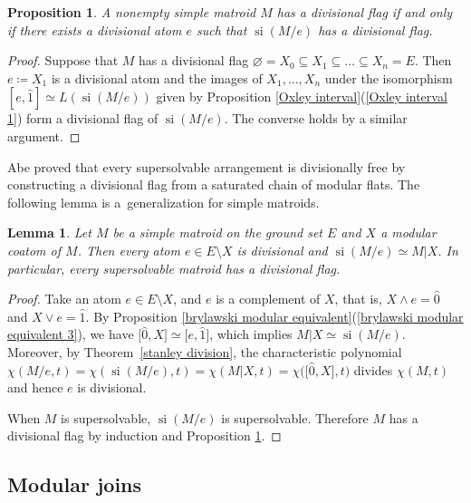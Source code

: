 \documentclass[11pt]{article}
\newtheorem{Lemma}[Theorem]{Lemma}
\newtheorem{Proposition}[Theorem]{Proposition}
 { \theoremstyle{definition}
\newtheorem{Definition}[Theorem]{Definition}
\newtheorem{Example}[Theorem]{Example}
\newtheorem{Remark}[Theorem]{Remark}
\newtheorem{Question}[Theorem]{Question} }
\DeclareMathOperator{\si}{si}
\begin{document}
\begin{Proposition}\label{divisional flag}
A nonempty simple matroid $ M $ has a divisional flag if and only if there exists a divisional atom $ e $ such that $ \si(M/e) $ has a divisional flag.
\end{Proposition}
\begin{proof}
Suppose that $ M $ has a divisional flag $ \varnothing = X_{0} \subseteq X_{1} \subseteq \dots \subseteq X_{n} = E $.
Then $ e \coloneqq X_{1} $ is a divisional atom and the images of $ X_{1}, \dots, X_{n} $ under the isomorphism $ [e, \hat{1}] \simeq L(\si(M/e)) $ given by Proposition \ref{Oxley interval}(\ref{Oxley interval 1}) form a divisional flag of $ \si(M/e) $.
The converse holds by a similar argument.
\end{proof}

Abe \cite[Proposition 5]{abe2017restrictions-pilt} proved that every supersolvable arrangement is divisionally free by constructing a divisional flag from a saturated chain of modular flats. The following lemma is a~generalization for simple matroids.

\begin{Lemma}\label{modular coatom divisional}
Let $ M $ be a simple matroid on the ground set $ E $ and $ X $ a modular coatom of $ M $.
Then every atom $ e \in E \setminus X $ is divisional and $ \si(M/e) \simeq M|X $.
In particular, every supersolvable matroid has a divisional flag.
\end{Lemma}
\begin{proof}
Take an atom $ e \in E\setminus X $, and $ e $ is a complement of $ X $, that is, $ X \wedge e = \hat{0} $ and $ X \vee e = \hat{1} $.
By Proposition \ref{brylawski modular equivalent}(\ref{brylawski modular equivalent 3}), we have $ \big[\hat{0}, X\big] \simeq \big[e, \hat{1}\big] $, which implies $ M|X \simeq \si(M/e) $.
Moreover, by Theo\-rem~\ref{stanley division}, the characteristic polynomial $ \chi(M/e,t) = \chi(\si(M/e),t) = \chi(M|X,t) = \chi\big(\big[\hat{0}, X\big], t\big) $ divides $ \chi(M,t) $ and hence $ e $ is divisional.

When $ M $ is supersolvable, $ \si(M/e) $ is supersolvable.
Therefore $ M $ has a divisional flag by induction and Proposition \ref{divisional flag}.
\end{proof}

\subsection{Modular joins}
\end{document}
